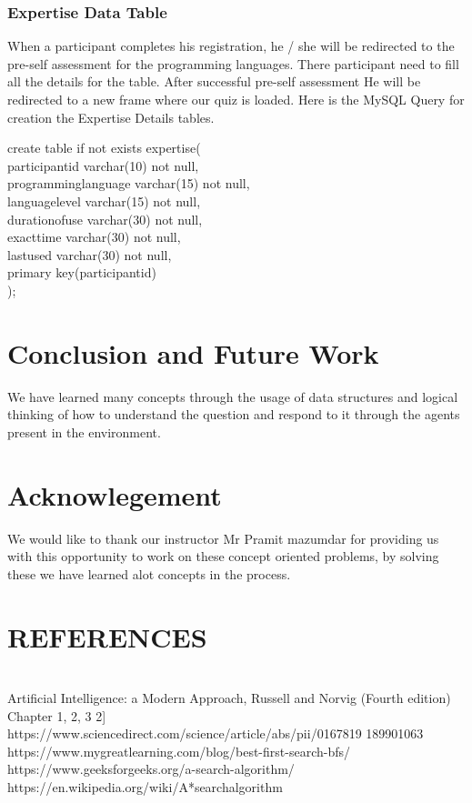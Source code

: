 \documentclass[10pt,a4paper,openright]{IEEEtran}
\begin{document}
\subsubsection{Expertise Data Table}
When a participant completes his registration, he / she will be redirected to the pre-self assessment for the programming languages. There participant need to fill all the details for the table. After successful pre-self assessment He will be redirected to a new frame where our quiz is loaded. Here is the MySQL Query for creation the Expertise Details tables.
\begin{tcolorbox}
create table if not exists expertise( \\
participantid varchar(10) not null, \\
programminglanguage varchar(15) not null,\\
languagelevel varchar(15) not null,\\
durationofuse varchar(30) not null,\\
exacttime varchar(30) not null,\\
lastused varchar(30) not null,\\
primary key(participantid)\\
);
\end{tcolorbox}

\section{Conclusion and Future Work}
We have learned many concepts through the usage of data
structures and logical thinking of how to understand the
question and respond to it through the agents present in the
environment.
\section*{Acknowlegement}
We would like to thank our instructor Mr Pramit mazumdar for
providing us with this opportunity to work on these concept
oriented problems, by solving these we have learned alot
concepts in the process.
%	

\section{REFERENCES} \\
Artificial Intelligence: a Modern Approach, Russell and
Norvig (Fourth edition) Chapter 1, 2, 3 2] \\
https://www.sciencedirect.com/science/article/abs/pii/0167819
189901063 \\
https://www.mygreatlearning.com/blog/best-first-search-bfs/ \\
https://www.geeksforgeeks.org/a-search-algorithm/ \\
https://en.wikipedia.org/wiki/A*searchalgorithm \\

	
\end{document}
